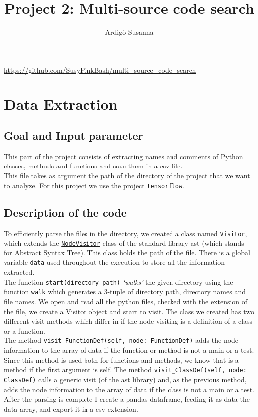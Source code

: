 \documentclass [14 pt]{article}
\title{Project 2: Multi-source code search}
\author{Ardig\`o Susanna}
\begin{document}
\pagestyle{fancy}
\fancyhf{}
\cfoot{\thepage}

\begin{titlingpage}
\maketitle
\centering
\url{https://github.com/SusyPinkBash/multi_source_code_search}
\end{titlingpage}

\newpage\thispagestyle{plain}
\tableofcontents
\newpage

\section{Data Extraction} %
\subsection{Goal and Input parameter} %
This part of the project consists of extracting names and comments of Python classes, methods and functions and save them in a csv file.\\
This file takes as argument the path of the directory of the project that we want to analyze. For this project we use the project \texttt{tensorflow}.

\subsection{Description of the code} %
To efficiently parse the files in the directory, we created a class named \texttt{Visitor}, which extends the \href{https://docs.python.org/3/library/ast.html#ast.NodeVisitor}{\texttt{NodeVisitor}} class of the standard library ast (which stands for Abstract Syntax Tree). This class holds the path of the file. There is a global variable \texttt{data} used throughout the execution to store all the information extracted.\\
The function \texttt{start(directory\_path)} \emph{`walks'} the given directory using the function \texttt{walk} which generates a 3-tuple of directory path, directory names and file names. We open and read all the python files, checked with the extension of the file, we create a Visitor object and start to visit. The class we created has two different visit methods which differ in if the node visiting is a definition of a class or a function.\\
The method \texttt{visit\_FunctionDef(self, node: FunctionDef)} adds the node information to the array of data if the function or method is not a main or a test. Since this method is used both for functions and methods, we know that is a method if the first argument is self.
The method \texttt{visit\_ClassDef(self, node: ClassDef)} calls a generic visit (of the ast library) and, as the previous method, adds the node information to the array of data if the class is not a main or a test. \\
After the parsing is complete I create a pandas dataframe, feeding it as data the data array, and export it in a csv extension.
\end{document}
